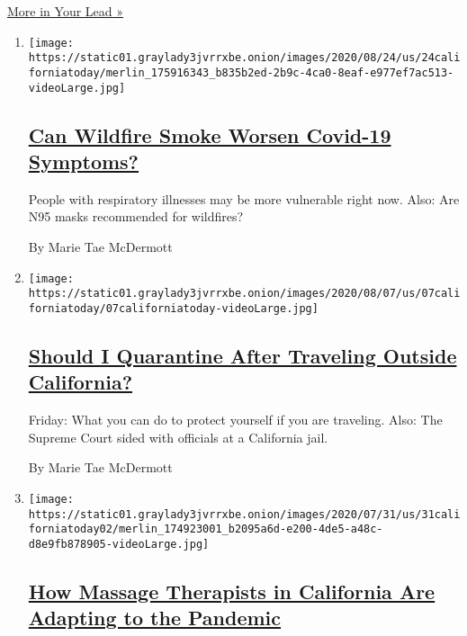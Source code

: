 \href{/series/your-lead}{More in Your Lead »}

\begin{enumerate}
\def\labelenumi{\arabic{enumi}.}
\item
  \texttt{[image: https://static01.graylady3jvrrxbe.onion/images/2020/08/24/us/24californiatoday/merlin\_175916343\_b835b2ed-2b9c-4ca0-8eaf-e977ef7ac513-videoLarge.jpg]}

  \hypertarget{can-wildfire-smoke-worsen-covid-19-symptoms}{%
  \subsection{\texorpdfstring{\href{/2020/08/21/us/wildfire-smoke-covid-n95-masks.html}{Can
  Wildfire Smoke Worsen Covid-19
  Symptoms?}}{Can Wildfire Smoke Worsen Covid-19 Symptoms?}}\label{can-wildfire-smoke-worsen-covid-19-symptoms}}

  People with respiratory illnesses may be more vulnerable right now.
  Also: Are N95 masks recommended for wildfires?

  By Marie Tae McDermott
\item
  \texttt{[image: https://static01.graylady3jvrrxbe.onion/images/2020/08/07/us/07californiatoday/07californiatoday-videoLarge.jpg]}

  \hypertarget{should-i-quarantine-after-traveling-outside-california}{%
  \subsection{\texorpdfstring{\href{/2020/08/07/us/california-travel-restrictions-covid-19.html}{Should
  I Quarantine After Traveling Outside
  California?}}{Should I Quarantine After Traveling Outside California?}}\label{should-i-quarantine-after-traveling-outside-california}}

  Friday: What you can do to protect yourself if you are traveling.
  Also: The Supreme Court sided with officials at a California jail.

  By Marie Tae McDermott
\item
  \texttt{[image: https://static01.graylady3jvrrxbe.onion/images/2020/07/31/us/31californiatoday02/merlin\_174923001\_b2095a6d-e200-4de5-a48c-d8e9fb878905-videoLarge.jpg]}

  \hypertarget{how-massage-therapists-in-california-are-adapting-to-the-pandemic}{%
  \subsection{\texorpdfstring{\href{/2020/07/31/us/essential-workers-massage-therapists.html}{How
  Massage Therapists in California Are Adapting to the
  Pandemic}}{How Massage Therapists in California Are Adapting to the Pandemic}}\label{how-massage-therapists-in-california-are-adapting-to-the-pandemic}}


\end{enumerate}
